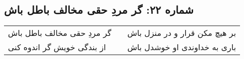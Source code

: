 \begin{center}
\section*{شماره ۲۲: گر مردِ حقی مخالف باطل باش}
\label{sec:022}
\begin{longtable}{l p{0.5cm} r}
گر مردِ حقی مخالف باطل باش
&&
بر هیچ مکن قرار و در منزل باش
\\
از بندگی خویش گر اندوه کنی
&&
باری به خداوندی او خوشدل باش
\\
\end{longtable}
\end{center}
